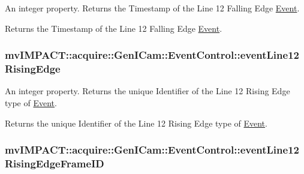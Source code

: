 An integer property. Returns the Timestamp of the Line 12 Falling Edge \hyperlink{classmv_i_m_p_a_c_t_1_1acquire_1_1_event}{Event}. 

Returns the Timestamp of the Line 12 Falling Edge \hyperlink{classmv_i_m_p_a_c_t_1_1acquire_1_1_event}{Event}. \hypertarget{classmv_i_m_p_a_c_t_1_1acquire_1_1_gen_i_cam_1_1_event_control_a48e02ac4da89eb63ac5c7d58e3f6b167}{
\subsubsection[{event\+Line12\+Rising\+Edge}]{ mv\+I\+M\+P\+A\+C\+T\+::acquire\+::\+Gen\+I\+Cam\+::\+Event\+Control\+::event\+Line12\+Rising\+Edge}}\label{classmv_i_m_p_a_c_t_1_1acquire_1_1_gen_i_cam_1_1_event_control_a48e02ac4da89eb63ac5c7d58e3f6b167}


An integer property. Returns the unique Identifier of the Line 12 Rising Edge type of \hyperlink{classmv_i_m_p_a_c_t_1_1acquire_1_1_event}{Event}. 

Returns the unique Identifier of the Line 12 Rising Edge type of \hyperlink{classmv_i_m_p_a_c_t_1_1acquire_1_1_event}{Event}. \hypertarget{classmv_i_m_p_a_c_t_1_1acquire_1_1_gen_i_cam_1_1_event_control_a83ba895a2309cb03b49488cefb322807}{
\subsubsection[{event\+Line12\+Rising\+Edge\+Frame\+I\+D}]{ mv\+I\+M\+P\+A\+C\+T\+::acquire\+::\+Gen\+I\+Cam\+::\+Event\+Control\+::event\+Line12\+Rising\+Edge\+Frame\+I\+D}}\label{classmv_i_m_p_a_c_t_1_1acquire_1_1_gen_i_cam_1_1_event_control_a83ba895a2309cb03b49488cefb322807}


